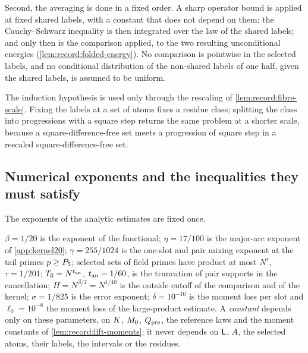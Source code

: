 Second, the averaging is done in a fixed order. A sharp operator bound is
applied at fixed shared labels, with a constant that does not depend on
them; the Cauchy--Schwarz inequality is then integrated over the law of the
shared labels; and only then is the comparison applied, to the two resulting
unconditional energies (\cref{lem:record:folded-energy}). No comparison is
pointwise in the selected labels, and no conditional
distribution of the non-shared labels of one half, given the
shared labels, is assumed to be uniform.

The induction hypothesis is used only through the rescaling of
\cref{lem:record:fibre-scale}. Fixing the labels at a set of atoms fixes a
residue class; splitting the class into progressions with a square step
returns the same problem at a shorter scale, because a square-difference-free
set meets a progression of square step in a rescaled square-difference-free
set.

\subsection{Numerical exponents and the inequalities they must satisfy}\label{subsec:scale:stage}

The exponents of the analytic estimates are fixed once.

\begin{definition}\label{def:record:analytic-stage}
$\beta=1/20$ is the exponent of the functional; $\eta=17/100$ is the
major-arc exponent of \cref{app:kernel20}; $\gamma=255/1024$ is the
one-slot and pair mixing exponent at the tail primes $p\ge P_5$; selected
sets of field primes have product at most $N^\tau$, $\tau=1/201$;
$T_0=N^{t_{\rm an}}$, $t_{\rm an}=1/60$, is the truncation of pair supports
in the cancellation; $H=N^{\beta/2}=N^{1/40}$ is the outside cutoff of the
comparison and of the kernel; $\sigma=1/825$ is the error exponent;
$\delta=10^{-10}$ is the moment loss per slot and $\ell_0=10^{-8}$ the
moment loss of the large-product estimate. A \emph{constant} depends only on
these parameters, on $K$, $M_0$, $Q_{\rm pre}$, the reference laws and
the moment constants of \cref{lem:record:lift-moments}; it never depends on
$\mathsf L$, $A$, the selected atoms, their labels, the intervals or the residues.
\end{definition}

